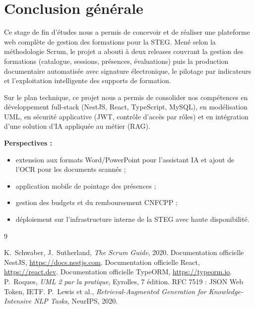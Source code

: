 \documentclass[12pt,a4paper]{report}
\begin{document}
\chapter*{Conclusion générale}

Ce stage de fin d'études nous a permis de concevoir et de réaliser une
plateforme web complète de gestion des formations pour la STEG. Mené selon
la méthodologie Scrum, le projet a abouti à deux releases couvrant la gestion
des formations (catalogue, sessions, présences, évaluations) puis la
production documentaire automatisée avec signature électronique, le pilotage
par indicateurs et l'exploitation intelligente des supports de formation.

Sur le plan technique, ce projet nous a permis de consolider nos
compétences en développement full-stack (NestJS, React, TypeScript,
MySQL), en modélisation UML, en sécurité applicative (JWT, contrôle d'accès
par rôles) et en intégration d'une solution d'IA appliquée au métier (RAG).

\textbf{Perspectives :}
\begin{itemize}
  \item extension aux formats Word/PowerPoint pour l'assistant IA et ajout
    de l'OCR pour les documents scannés ;
  \item application mobile de pointage des présences ;
  \item gestion des budgets et du remboursement CNFCPP ;
  \item déploiement sur l'infrastructure interne de la STEG avec haute
    disponibilité.
\end{itemize}

\begin{thebibliography}{9}
 K.~Schwaber, J.~Sutherland, \emph{The Scrum Guide}, 2020.
 Documentation officielle NestJS, \url{https://docs.nestjs.com}.
 Documentation officielle React, \url{https://react.dev}.
 Documentation officielle TypeORM, \url{https://typeorm.io}.
 P.~Roques, \emph{UML 2 par la pratique}, Eyrolles, 7\ieme{} édition.
 RFC 7519 : JSON Web Token, IETF.
 P.~Lewis et al., \emph{Retrieval-Augmented Generation for
Knowledge-Intensive NLP Tasks}, NeurIPS, 2020.
\end{thebibliography}
\end{document}
